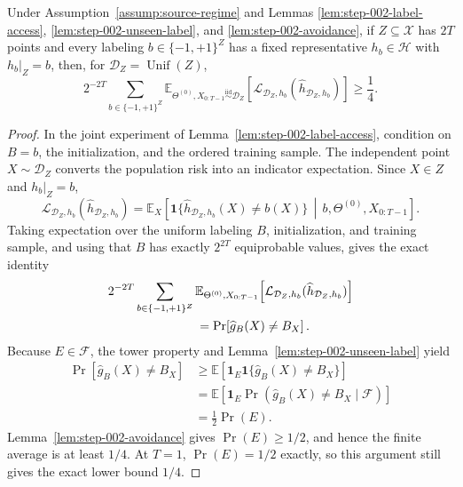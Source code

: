 \begin{proposition}
\label{prop:step-002-average-risk}
Under Assumption~\ref{assump:source-regime} and Lemmas
\ref{lem:step-002-label-access}, \ref{lem:step-002-unseen-label}, and
\ref{lem:step-002-avoidance}, if $Z\subseteq\mathcal X$ has $2T$ points and
every labeling $b\in\{-1,+1\}^{Z}$ has a fixed representative
$h_b\in\mathcal H$ with $h_b|_Z=b$, then, for
$\mathcal D_Z=\operatorname{Unif}(Z)$,
\[
2^{-2T}\sum_{b\in\{-1,+1\}^{Z}}
\mathbb E_{\Theta^{(0)},X_{0:T-1}\stackrel{\mathrm{iid}}{\sim}\mathcal D_Z}
\!\left[\mathcal L_{\mathcal D_Z,h_b}
(\widehat h_{\mathcal D_Z,h_b})\right]\geq\frac14.
\]
\end{proposition}

\begin{proof}
In the joint experiment of Lemma~\ref{lem:step-002-label-access}, condition
on $B=b$, the initialization, and the ordered training sample.  The
independent point $X\sim\mathcal D_Z$ converts the population risk into an
indicator expectation.  Since $X\in Z$ and $h_b|_Z=b$,
\[
\mathcal L_{\mathcal D_Z,h_b}(\widehat h_{\mathcal D_Z,h_b})
=\mathbb E_X\!\left[
\mathbf 1\{\widehat h_{\mathcal D_Z,h_b}(X)\ne b(X)\}
\,\middle|\,b,\Theta^{(0)},X_{0:T-1}\right].
\]
Taking expectation over the uniform labeling $B$, initialization, and
training sample, and using that $B$ has exactly $2^{2T}$ equiprobable values,
gives the exact identity
\[
\begin{aligned}
&2^{-2T}\sum_{b\in\{-1,+1\}^{Z}}
\mathbb E_{\Theta^{(0)},X_{0:T-1}}
\!\left[\mathcal L_{\mathcal D_Z,h_b}
(\widehat h_{\mathcal D_Z,h_b})\right]\\
&\hspace{25mm}=\Pr\!\left[\widehat g_B(X)\ne B_X\right].
\end{aligned}
\]
Because $E\in\mathscr F$, the tower property and
Lemma~\ref{lem:step-002-unseen-label} yield
\[
\begin{aligned}
\Pr\!\left[\widehat g_B(X)\ne B_X\right]
&\geq\mathbb E\!\left[\mathbf 1_E\mathbf 1\{\widehat g_B(X)\ne B_X\}\right]\\
&=\mathbb E\!\left[\mathbf 1_E
\Pr\!\left(\widehat g_B(X)\ne B_X\mid\mathscr F\right)\right]\\
&=\frac12\Pr(E).
\end{aligned}
\]
Lemma~\ref{lem:step-002-avoidance} gives $\Pr(E)\geq 1/2$, and hence the
finite average is at least $1/4$.  At $T=1$, $\Pr(E)=1/2$ exactly, so this
argument still gives the exact lower bound $1/4$.
\end{proof}

